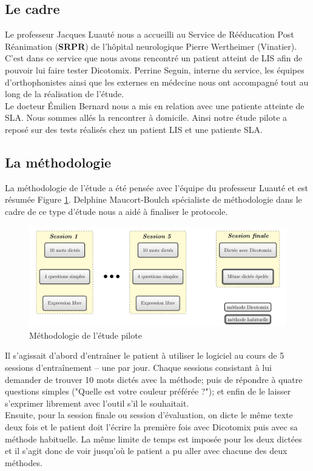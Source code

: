 \documentclass[11pt,a4paper]{article}
\theoremstyle{plain}
\theoremstyle{definition}
\begin{document}
\subsection{Le cadre}

Le professeur Jacques Luauté nous a accueilli au Service de Rééducation Post Réanimation (\textbf{SRPR}) de l'hôpital neurologique 
Pierre Wertheimer (Vinatier). C'est dans ce service que nous avons rencontré un patient atteint de LIS afin de pouvoir lui faire tester Dicotomix.
Perrine Seguin, interne du service, les équipes d'orthophonistes ainsi que les externes en médecine nous ont accompagné tout au long de 
la réalisation de l'étude. \\

Le docteur Émilien Bernard nous a mis en relation avec une patiente atteinte de SLA. Nous sommes allés la rencontrer à domicile.
Ainsi notre étude pilote a reposé sur des tests réalisés chez un patient LIS et une patiente SLA.

\subsection{La méthodologie}

La méthodologie de l'étude a été pensée avec l'équipe du professeur Luauté et est résumée Figure \ref{etude}. Delphine Maucort-Boulch spécialiste de méthodologie 
dans le cadre de ce type d'étude nous a aidé à finaliser le protocole.

\begin{figure}[h!]
\centering
\includegraphics[scale=0.2]{schemaEtudePilote.jpg}
\caption{Méthodologie de l'étude pilote}
\label{etude}
\end{figure}

Il s'agissait d'abord d'entraîner le patient à utiliser le logiciel au cours de 5 sessions d'entraînement -- une par jour. Chaque sessions 
consistant à lui demander de trouver 10 mots dictés avec la méthode; puis de répondre à quatre questions simples ("Quelle est votre couleur préférée ?"); et 
enfin de le laisser s'exprimer librement avec l'outil s'il le souhaitait. \\
Ensuite, pour la session finale ou session d'évaluation, on dicte le même texte deux fois et le patient doit l'écrire la première fois avec Dicotomix puis avec
sa méthode habituelle. La même limite de temps est imposée pour les deux dictées et il s'agit donc de voir jusqu'où le patient a pu aller avec chacune des 
deux méthodes.
\end{document}
